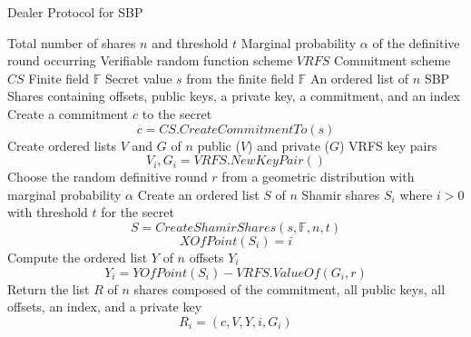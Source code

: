 \documentclass{dalcsthesis}
\begin{document}
\begin{algorithm}
  \caption{Dealer Protocol for SBP}
  \label{alg:SBP:Dealer}
  \begin{algorithmic}
    \INPUT Total number of shares $n$ and threshold $t$
    \INPUT Marginal probability $\alpha$ of the definitive round occurring
    \INPUT Verifiable random function scheme $VRFS$
    \INPUT Commitment scheme $CS$
    \INPUT Finite field $\mathbb{F}$
    \INPUT Secret value $s$ from the finite field $\mathbb{F}$
    \OUTPUT An ordered list of $n$ SBP Shares containing offsets, public keys, a private key, a commitment, and an index
    \STATE Create a commitment $c$ to the secret
    	$$c = CS.CreateCommitmentTo(s)$$
    \STATE Create ordered lists $V$ and $G$ of $n$ public ($V$) and private ($G$) VRFS key pairs
    	$$V_i, G_i = VRFS.NewKeyPair()$$
    \STATE Choose the random definitive round $r$ from a geometric distribution with marginal probability $\alpha$
    \STATE Create an ordered list $S$ of $n$ Shamir shares $S_i$ where $i > 0$ with threshold $t$ for the secret
    	$$S = CreateShamirShares(s, \mathbb{F}, n, t)$$
    	$$XOfPoint(S_i) = i$$
    \STATE Compute the ordered list $Y$ of $n$ offsets $Y_i$
    	$$Y_i = YOfPoint(S_i) - VRFS.ValueOf(G_i, r)$$
    \STATE Return the list $R$ of $n$ shares composed of the commitment, all public keys, all offsets, an index, and a private key
    	$$R_i = (c, V, Y, i, G_i)$$
  \end{algorithmic}
\end{algorithm}
\end{document}
